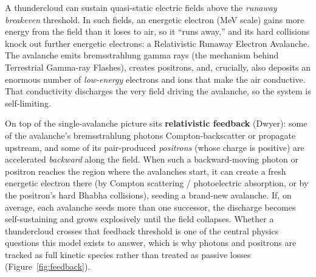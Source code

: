 \documentclass[11pt]{article}
\begin{document}
A thundercloud can sustain quasi-static electric fields above the
\emph{runaway breakeven} threshold. In such fields, an energetic electron
(MeV scale) gains more energy from the field than it loses to air, so it
``runs away,'' and its hard collisions knock out further energetic
electrons: a Relativistic Runaway Electron Avalanche. The avalanche emits
bremsstrahlung gamma rays (the mechanism behind Terrestrial Gamma-ray
Flashes), creates positrons, and, crucially, also deposits an enormous
number of \emph{low-energy} electrons and ions that make the air
conductive. That conductivity discharges the very field driving the
avalanche, so the system is self-limiting.

On top of the single-avalanche picture sits \textbf{relativistic feedback}
(Dwyer): some of the avalanche's bremsstrahlung photons Compton-backscatter
or propagate upstream, and some of its pair-produced \emph{positrons}
(whose charge is positive) are accelerated \emph{backward} along the
field. When such a backward-moving photon or positron reaches the region
where the avalanches start, it can create a fresh energetic electron there
(by Compton scattering / photoelectric absorption, or by the positron's
hard Bhabha collisions), seeding a brand-new avalanche. If, on average,
each avalanche seeds more than one successor, the discharge becomes
self-sustaining and grows explosively until the field collapses. Whether a
thundercloud crosses that feedback threshold is one of the central physics
questions this model exists to answer, which is why photons and positrons
are tracked as full kinetic species rather than treated as passive losses
(Figure~\ref{fig:feedback}).
\end{document}
